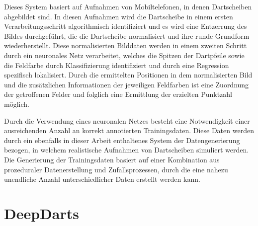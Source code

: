 Dieses System basiert auf Aufnahmen von Mobiltelefonen, in denen Dartscheiben abgebildet sind. In diesen Aufnahmen wird die Dartscheibe in einem ersten Verarbeitungsschritt algorithmisch identifiziert und es wird eine Entzerrung des Bildes durchgeführt, die die Dartscheibe normalisiert und ihre runde Grundform wiederherstellt. Diese normalisierten Bilddaten werden in einem zweiten Schritt durch ein neuronales Netz verarbeitet, welches die Spitzen der Dartpfeile sowie die Feldfarbe durch Klassifizierung identifiziert und durch eine Regression spezifisch lokalisiert. Durch die ermittelten Positionen in dem normalisierten Bild und die zusätzlichen Informationen der jeweiligen Feldfarben ist eine Zuordnung der getroffenen Felder und folglich eine Ermittlung der erzielten Punktzahl möglich.

Durch die Verwendung eines neuronalen Netzes besteht eine Notwendigkeit einer ausreichenden Anzahl an korrekt annotierten Trainingsdaten. Diese Daten werden durch ein ebenfalls in dieser Arbeit enthaltenes System der Datengenerierung bezogen, in welchem realistische Aufnahmen von Dartscheiben simuliert werden. Die Generierung der Trainingsdaten basiert auf einer Kombination aus prozeduraler Datenerstellung und Zufallsprozessen, durch die eine nahezu unendliche Anzahl unterschiedlicher Daten erstellt werden kann.





\section{DeepDarts}
\label{sec:deepdarts}

